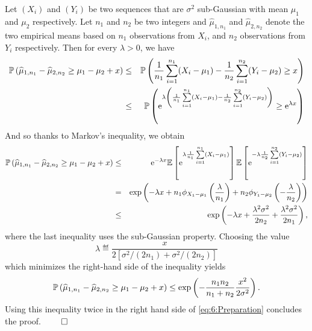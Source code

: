 Let $(X_i)$ and $(Y_i)$ be two \iid{} sequences that are $\sigma^2$ sub-Gaussian with mean $\mu_1$ and $\mu_2$ respectively. Let $n_1$ and $n_2$ be two integers and $\widehat{\mu}_{1,n_1}$ and $\widehat{\mu}_{2,n_2}$ denote the two empirical means based on $n_1$ observations from $X_i$, and $n_2$ observations from $Y_i$ respectively.
Then for every $\lambda > 0$, we have
\begin{eqnarray*}
    \mathbb{P}\left(\widehat{\mu}_{1,n_1} - \widehat{\mu}_{2,n_2} \geq \mu_1 - \mu_2 + x \right)
    & \leq & \mathbb{P}\left(\frac{1}{n_1}\sum_{i=1}^{n_1} (X_i-\mu_1) - \frac{1}{n_2}\sum_{i=1}^{n_2} (Y_i - \mu_2) \geq x \right)\\
    & \leq & \mathbb{P}\left(\mathrm{e}^{\lambda \left(\frac{1}{n_1}\sum\limits_{i=1}^{n_1} (X_i-\mu_1) - \frac{1}{n_2}\sum\limits_{i=1}^{n_2} (Y_i - \mu_2)\right)} \geq \mathrm{e}^{\lambda x} \right)
\end{eqnarray*}
And so thanks to Markov's inequality, we obtain
\begin{eqnarray*}
    \mathbb{P}\left(\widehat{\mu}_{1,n_1} - \widehat{\mu}_{2,n_2} \geq \mu_1 - \mu_2 + x \right)
    & \leq & \mathrm{e}^{-\lambda x}\mathbb{E}\left[\mathrm{e}^{\lambda \frac{1}{n_1}\sum\limits_{i=1}^{n_1} (X_i-\mu_1)}\right]\mathbb{E}\left[\mathrm{e}^{-\lambda \frac{1}{n_2}\sum\limits_{i=1}^{n_2} (Y_i-\mu_2)}\right] \\
    & = & \exp\left(- \lambda x + n_1\phi_{X_1 - \mu_1}\left(\frac{\lambda}{n_1}\right) + n_2\phi_{Y_1 - \mu_2}\left(-\frac{\lambda}{n_2}\right)\right) \\
    & \leq & \exp\left(- \lambda x + \frac{\lambda^2\sigma^2}{2n_2} + \frac{\lambda^2\sigma^2}{2n_1}\right),
\end{eqnarray*}
%
where the last inequality uses the sub-Gaussian property.
%
Choosing the value
\[\lambda \eqdef \frac{x}{2\left[\sigma^2/(2n_1) + \sigma^2/(2n_2)\right]}\]
which minimizes the right-hand side of the inequality yields
\[\mathbb{P}\left(\widehat{\mu}_{1,n_1} - \widehat{\mu}_{2,n_2} \geq \mu_1 - \mu_2 + x \right) \leq \exp\left(- \frac{n_1n_2}{n_1+n_2}\frac{x^2}{2\sigma^2}\right).\]
%
Using this inequality twice in the right hand side of \eqref{eq:6:Preparation} concludes the proof.
\hfill{} $\qed$  %



